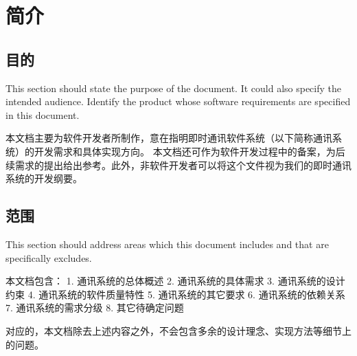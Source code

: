 \chapter{简介}
\section{目的}
This section should state the purpose of the document. It could also specify the intended audience. Identify the product whose software requirements are specified in this document.

本文档主要为软件开发者所制作，意在指明即时通讯软件系统（以下简称通讯系统）的开发需求和具体实现方向。
本文档还可作为软件开发过程中的备案，为后续需求的提出给出参考。此外，非软件开发者可以将这个文件视为我们的即时通讯系统的开发纲要。

\section{范围}
This section should address areas which this document includes and that are specifically excludes. 

本文档包含：
1. 通讯系统的总体概述
2. 通讯系统的具体需求
3. 通讯系统的设计约束
4. 通讯系统的软件质量特性
5. 通讯系统的其它要求
6. 通讯系统的依赖关系
7. 通讯系统的需求分级
8. 其它待确定问题

对应的，本文档除去上述内容之外，不会包含多余的设计理念、实现方法等细节上的问题。
